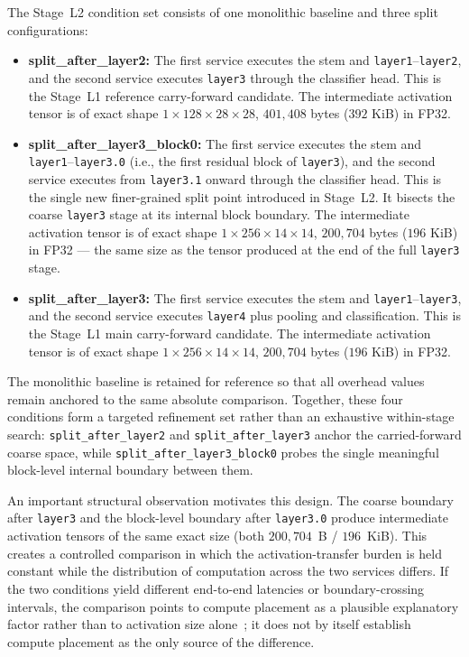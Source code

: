The Stage~L2 condition set consists of one monolithic baseline and three split configurations:

\begin{itemize}
    \item \textbf{split\_after\_layer2:} The first service executes the stem and \texttt{layer1}--\texttt{layer2}, and the second service executes \texttt{layer3} through the classifier head. This is the Stage~L1 reference carry-forward candidate. The intermediate activation tensor is of exact shape $1 \times 128 \times 28 \times 28$, $401{,}408$ bytes ($392$ KiB) in FP32.

    \item \textbf{split\_after\_layer3\_block0:} The first service executes the stem and \texttt{layer1}--\texttt{layer3.0} (i.e., the first residual block of \texttt{layer3}), and the second service executes from \texttt{layer3.1} onward through the classifier head. This is the single new finer-grained split point introduced in Stage~L2. It bisects the coarse \texttt{layer3} stage at its internal block boundary. The intermediate activation tensor is of exact shape $1 \times 256 \times 14 \times 14$, $200{,}704$ bytes ($196$ KiB) in FP32 --- the same size as the tensor produced at the end of the full \texttt{layer3} stage.

    \item \textbf{split\_after\_layer3:} The first service executes the stem and \texttt{layer1}--\texttt{layer3}, and the second service executes \texttt{layer4} plus pooling and classification. This is the Stage~L1 main carry-forward candidate. The intermediate activation tensor is of exact shape $1 \times 256 \times 14 \times 14$, $200{,}704$ bytes ($196$ KiB) in FP32.
\end{itemize}

The monolithic baseline is retained for reference so that all overhead values remain anchored to the same absolute comparison. Together, these four conditions form a targeted refinement set rather than an exhaustive within-stage search: \texttt{split\_after\_layer2} and \texttt{split\_after\_layer3} anchor the carried-forward coarse space, while \texttt{split\_after\_layer3\_block0} probes the single meaningful block-level internal boundary between them.

An important structural observation motivates this design. The coarse boundary after \texttt{layer3} and the block-level boundary after \texttt{layer3.0} produce intermediate activation tensors of the same exact size (both $200{,}704$~B / $196$~KiB). This creates a controlled comparison in which the activation-transfer burden is held constant while the distribution of computation across the two services differs. If the two conditions yield different end-to-end latencies or boundary-crossing intervals, the comparison points to compute placement as a plausible explanatory factor rather than to activation size alone~\cite{pareto_split}; it does not by itself establish compute placement as the only source of the difference.

